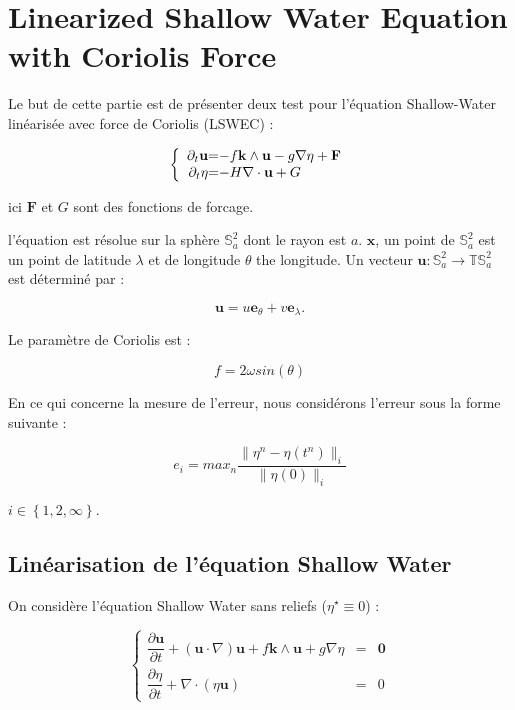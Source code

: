 \chapter{Linearized Shallow Water Equation with Coriolis Force}

Le but de cette partie est de présenter deux test pour l'équation Shallow-Water linéarisée avec force de Coriolis (LSWEC) :

\begin{equation}
\label{LSWEC}
\left\lbrace
\begin{array}{r @{=} l}
\partial_t \mathbf{u} & -f \mathbf{k} \wedge \mathbf{u} - g \nabla \eta + \mathbf{F} \\
\partial_t \eta & -H \nabla \cdot \mathbf{u} + G
\end{array}
\right.
\end{equation}

ici $\mathbf{F}$ et $G$ sont des fonctions de forcage.

l'équation est résolue sur la sphère $\mathbb{S}_a^2$ dont le rayon est $a$. $\mathbf{x}$, un point de $\mathbb{S}_a^2$ est un point de latitude $\lambda$ et de longitude $\theta$ the longitude. Un vecteur $\mathbf{u} : \mathbb{S}_a^2 \rightarrow \mathbb{T}\mathbb{S}_a^2$ est déterminé par :

$$\mathbf{u} = u \mathbf{e}_{\theta} + v \mathbf{e}_{\lambda}.$$ 

Le paramètre de Coriolis est :

\begin{equation}
f=2 \omega sin ( \theta )
\label{coriolis_parameter}
\end{equation}

En ce qui concerne la mesure de l'erreur, nous considérons l'erreur sous la forme suivante :

$$e_{i} = max_n \dfrac{\| \eta^n - \eta(t^n) \|_{i}}{\| \eta(0) \|_{i}}$$

$i \in \left\lbrace 1, 2, \infty \right\rbrace$.

\section{Linéarisation de l'équation Shallow Water}

On considère l'équation Shallow Water sans reliefs ($\eta^{\star} \equiv 0$) :

\begin{equation}
\label{eq:SWE_without relief}
\left\lbrace
\begin{array}{rcl}
\dfrac{\partial \mathbf{u}}{\partial t} + \left( \mathbf{u} \cdot \nabla \right) \mathbf{u} + f \mathbf{k} \wedge \mathbf{u} + g \nabla \eta & = & \mathbf{0} \\
\dfrac{\partial \eta}{\partial t} + \nabla \cdot \left( \eta \mathbf{u} \right) & = & 0
\end{array}
\right.
\end{equation}

